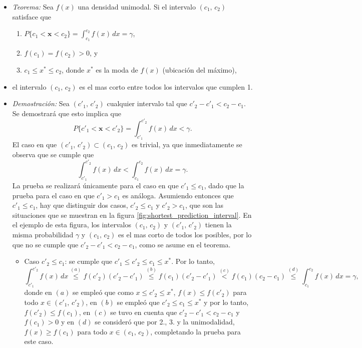 \documentclass[a4paper]{report}
\newcommand{\x}{\mathbf{x}}
\begin{document}
\begin{itemize}
 \item[] \emph{Teorema:} Sea \(f(x)\) una densidad unimodal. Si el intervalo \((c_1,\,c_2)\) satisface que 
 \begin{enumerate}
  \item \(\displaystyle P\{c_1<\x<c_2\}=\int_{c_1}^{c_2}f(x)\,dx=\gamma\),
  \item \(f(c_1)=f(c_2)>0\), y
  \item \(c_1\leq x^*\leq c_2\), donde \(x^*\) es la moda de \(f(x)\) (ubicación del máximo),
 \end{enumerate}
 \item[] el intervalo \((c_1,\,c_2)\) es el mas corto entre todos los intervalos que cumplen 1.
 \item[] \emph{Demostración:} Sea \((c'_1,\,c'_2)\) cualquier intervalo tal que \(c'_2-c'_1<c_2-c_1\). Se demostrará que esto implica que
 \[
  P\{c'_1<\x<c'_2\}=\int_{c'_1}^{c'_2}f(x)\,dx<\gamma.
 \]
 El caso en que \((c'_1,\,c'_2)\subset(c_1,\,c_2)\) es trivial, ya que inmediatamente se observa que se cumple que
 \[
  \int_{c'_1}^{c'_2}f(x)\,dx<\int_{c_1}^{c_2}f(x)\,dx=\gamma.
 \]
 La prueba se realizará únicamente para el caso en que \(c'_1\leq c_1\), dado que la prueba para el caso en que \(c'_1>c_1\) es análoga. Asumiendo entonces que \(c'_1\leq c_1\), hay que distinguir dos casos, \(c'_2\leq c_1\) y \(c'_2>c_1\), que son las situaciones que se muestran en la figura  \ref{fig:shortest_prediction_interval}. En el ejemplo de esta figura, los intervalos \((c_1,\,c_2)\) y \((c'_1,\,c'_2)\) tienen la misma probabilidad \(\gamma\) y \((c_1,\,c_2)\) es el mas corto de todos los posibles, por lo que no se cumple que \(c'_2-c'_1<c_2-c_1\), como se asume en el teorema.
 \begin{itemize}
  \item Caso \(c'_2\leq c_1\): se cumple que \(c'_1\leq c'_2\leq c_1\leq x^*\). Por lo tanto,
  \[
   \int_{c'_1}^{c'_2}f(x)\,dx\overset{(a)}{\leq} f(c'_2)(c'_2-c'_1)
     \overset{(b)}{\leq}f(c_1)(c'_2-c'_1)
     \overset{(c)}{<}f(c_1)(c_2-c_1)
     \overset{(d)}{\leq}\int_{c_1}^{c_2}f(x)\,dx=\gamma,
  \]
  donde en \((a)\) se empleó que como \(x\leq c'_2\leq x^*\), \(f(x)\leq f(c'_2)\) para todo \(x\in(c'_1,\,c'_2)\), en \((b)\) se empleó que \(c'_2\leq c_1\leq x^*\) y por lo tanto, \(f(c'_2)\leq f(c_1)\), en \((c)\) se tuvo en cuenta que \(c'_2-c'_1<c_2-c_1\) y \(f(c_1)>0\) y en \((d)\) se consideró que por 2., 3. y la unimodalidad, \(f(x)\geq f(c_1)\) para todo \(x\in(c_1,\,c_2)\), completando la prueba para este caso.

\end{itemize}
\end{itemize}
\end{document}
